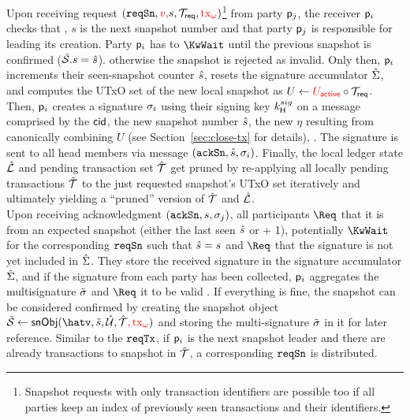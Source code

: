 \quad Upon receiving request
$(\mathtt{reqSn},\textcolor{red}{v,}s,{\mathcal T}_{\mathsf{req}}, \textcolor{red}{\mathrm{tx}_{\omega}})$\footnote{Snapshot requests
	with only transaction identifiers are possible too if all parties keep an
	index of previously seen transactions and their identifiers.} from party
$\mathsf p_j$, the receiver $\mathsf p_i$ checks that , $s$ is the next snapshot number
and that party $\mathsf p_j$ is responsible for leading its creation. Party $\mathsf p_i$ has to $\KwWait$ until the previous snapshot is
confirmed ($\bar{\mathcal S}.s = \hat s$). 
otherwise the snapshot is rejected as invalid. Only then, $\mathsf p_i$ increments
their seen-snapshot counter $\hat s$, resets the signature accumulator
$\hat{\Sigma}$, and computes the UTxO set of the new local snapshot as
$U \gets \textcolor{red}{U_{\mathsf{active}}} \circ {\mathcal T}_{\mathsf{req}}$. Then, $\mathsf p_i$
creates a signature $\sigma_i$ using their signing key $k^{sig}_\mathsf{H}$ on a
message comprised by the $\mathsf{cid}$, the new snapshot number $\hat s$, the new $\eta$
resulting from canonically combining $U$ (see Section~\ref{sec:close-tx} for
details), .
The signature is sent to all head members via message $(\mathtt{ackSn},\hat s,\sigma_i)$.
Finally, the local ledger state $\hat {\mathcal L}$ and pending transaction set $\hat {\mathcal T}$
get pruned by re-applying all locally pending transactions $\hat {\mathcal T}$ to the just
requested snapshot's UTxO set iteratively and
ultimately yielding a ``pruned'' version of $\hat {\mathcal T}$ and $\hat {\mathcal L}$. \\

\quad Upon receiving acknowledgment $(\mathtt{ackSn},s,\sigma_j)$, all
participants $\Req$ that it is from an expected snapshot (either the last seen
$\hat s$ or + 1), potentially $\KwWait$ for the corresponding $\mathtt{reqSn}$ such that
$\hat s = s$ and $\Req$ that the signature is not yet included in $\hat{\Sigma}$.
They store the received signature in the signature accumulator $\hat{\Sigma}$, and
if the signature from each party has been collected, $\mathsf p_i$ aggregates the
multisignature $\tilde\sigma$ and $\Req$ it to be valid . If everything is fine, the snapshot can be considered
confirmed by creating the snapshot object
$\bar{\mc S} \gets \Sno(\hatv, \hats, \hatmU, \hatmT \red{, \tx_{\omega}})$ and storing
the multi-signature $\tilde\sigma$ in it for later reference.  Similar to the $\mathtt{reqTx}$, if
$\mathsf p_i$ is the next snapshot leader and there are already transactions to
snapshot in $\hat {\mathcal T}$, a corresponding $\mathtt{reqSn}$ is distributed.

